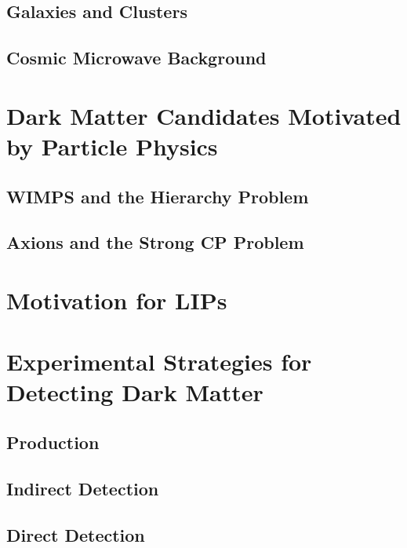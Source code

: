 \subsection{Galaxies and Clusters}
\subsection{Cosmic Microwave Background}

\section{Dark Matter Candidates Motivated by Particle Physics}
\subsection{WIMPS and the Hierarchy Problem}
\subsection{Axions and the Strong CP Problem}

\section{Motivation for LIPs}

\section{Experimental Strategies for Detecting Dark Matter}
\subsection{Production}

\subsection{Indirect Detection}

\subsection{Direct Detection}
